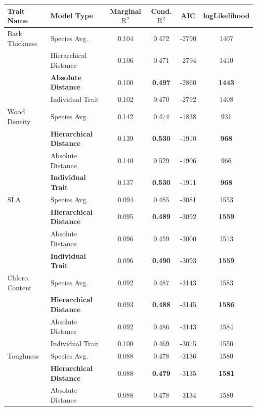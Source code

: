 \begin{table}[!pt]
	\begin{center}
		\begin{tabular}{llcccc}
		  \hline
		 Trait Name & Model Type & Marginal $\text{R}^2$ & Cond. $\text{R}^2$ & AIC & logLikelihood \\ 
		  \hline
		Bark Thickness & Species Avg. & 0.104 & 0.472 & -2790 & 1407 \\ 
		            & Hierarchical Distance & 0.106 & 0.471 & -2794 & 1410 \\ 
		            & \textbf{Absolute Distance} & 0.100 & \textbf{0.497} & -2860 & \textbf{1443} \\ 
		            & Individual Trait & 0.102 & 0.470 & -2792 & 1408 \\
		  \cline{2-6}
		  Wood Density & Species Avg. & 0.142 & 0.474 & -1838 & 931 \\ 
		               & \textbf{Hierarchical Distance} & 0.139 & \textbf{0.530} & -1910 & \textbf{968} \\ 
		               & Absolute Distance & 0.140 & 0.529 & -1906 & 966 \\ 
		               & \textbf{Individual Trait} & 0.137 & \textbf{0.530} & -1911 & \textbf{968} \\
		  \cline{2-6}
		  SLA & Species Avg. & 0.094 & 0.485 & -3081 & 1553 \\ 
		      & \textbf{Hierarchical Distance} & 0.095 & \textbf{0.489} & -3092 & \textbf{1559} \\ 
		      & Absolute Distance & 0.096 & 0.459 & -3000 & 1513 \\ 
		      & \textbf{Individual Trait} & 0.096 & \textbf{0.490} & -3093 & \textbf{1559} \\ 
		  \cline{2-6}
		  Chloro. Content & Species Avg. & 0.092 & 0.487 & -3143 & 1583 \\ 
		                  & \textbf{Hierarchical Distance} & 0.093 & \textbf{0.488} & -3145 & \textbf{1586} \\ 
		                  & Absolute Distance & 0.092 & 0.486 & -3143 & 1584 \\ 
		                  & Individual Trait & 0.100 & 0.469 & -3075 & 1550 \\
		  \cline{2-6}	
		  Toughness & Species Avg. & 0.088 & 0.478 & -3136 & 1580 \\ 
		            & \textbf{Hierarchical Distance} & 0.088 & \textbf{0.479} & -3135 & \textbf{1581} \\ 
		            & Absolute Distance & 0.088 & 0.478 & -3134 & 1580 \\ 

\end{tabular}
\end{center}
\end{table}
